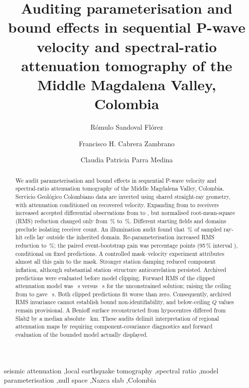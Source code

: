 \documentclass[review,authoryear,longtitle]{elsarticle}
\begin{document}
\linenumbers
\begin{frontmatter}

\title{Auditing parameterisation and bound effects in sequential P-wave
velocity and spectral-ratio attenuation tomography of the Middle
Magdalena Valley, Colombia}

\author[inst1]{R\'omulo Sandoval Fl\'orez}
\author[inst2]{Francisco H. Cabrera Zambrano}
\author[inst3]{Claudia Patricia Parra Medina}
\address[inst1]{Universidad ECCI, Carrera 19 No. 49--20, Bogot\'a, Colombia}
\address[inst2]{Grupo de Investigaci\'on Pangea, Universidad de Pamplona, Pamplona, Colombia}
\address[inst3]{Universidad Militar Nueva Granada, Carrera 11 No. 101--80, Bogot\'a, Colombia}

\begin{abstract}
We audit parameterisation and bound effects in sequential P-wave velocity and spectral-ratio attenuation tomography of the Middle Magdalena Valley, Colombia. Servicio Geol\'ogico Colombiano data are inverted using shared straight-ray geometry, with attenuation conditioned on recovered velocity. Expanding from \estPrevia{} to \estAdoptada{} receivers increased accepted differential observations from \qObsPrevia{} to \qObsAdoptada{}, but normalised root-mean-square (RMS) reduction changed only from \explPrevia\,\% to \explMascaraVieja\,\%. Different starting fields and domains preclude isolating receiver count. An illumination audit found that \fracCeldasFuera\,\% of sampled ray-hit cells lay outside the inherited domain. Re-parameterisation increased RMS reduction to \explMascaraRayos\,\%; the paired event-bootstrap gain was \auditDomainGain{} percentage points (95\,\% interval \auditDomainGainCI), conditional on fixed predictions. A controlled mask--velocity experiment attributes almost all this gain to the mask. Stronger station damping reduced component inflation, although substantial station--structure anticorrelation persisted. Archived predictions were evaluated before model clipping. Forward RMS of the clipped attenuation model was \rmsQRecortado~s versus \rmsFinalAdoptada~s for the unconstrained solution; raising the ceiling from \qTecho{} to \qTechoPrueba{} gave \rmsQRecortadoAlto~s. Both clipped predictions fit worse than zero. Consequently, archived RMS invariance cannot establish bound non-identifiability, and below-ceiling $Q$ values remain provisional. A Benioff surface reconstructed from \losaControles{} hypocentres differed from Slab2 by a median absolute \slabDifAbs~km. These audits delimit interpretation of regional attenuation maps by requiring component-covariance diagnostics and forward evaluation of the bounded model actually displayed.
\end{abstract}

\begin{keyword}
seismic attenuation \sep local earthquake tomography \sep spectral ratio
\sep model parameterisation \sep null space \sep Nazca slab \sep Colombia
\end{keyword}

\end{frontmatter}
\clearpage
\end{document}
